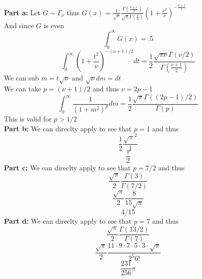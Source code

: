 \documentclass[answers,12pt,addpoints]{exam}
\begin{document}
\begin{questions}
    \begin{solution}
        \textbf{Part a:}
            Let $G \sim \Gamma_{\nu}$ thus 
            $G(x) = \frac{1}{\sqrt{\nu}} \frac{\Gamma(\frac{\nu + 1}{2})}{\sqrt{\pi} \Gamma(\frac{\nu}{2})} (1 + \frac{x^2}{\nu})^{-\frac{\nu + 1}{2}}$\\
            And since $G$ is even
            $$ \int_{0}^{\infty}G(x) = .5 $$
            $$ \int_0^{\infty} \left( 1 + \frac{t^2}{\nu}\right)^{-(\nu +1) /2 }dt = \frac{1}{2} \frac{\sqrt{\pi \nu} \Gamma(\nu/2)}{\Gamma(\frac{\nu +1}{2})} $$
            We can sub $m = t \sqrt{\nu}$ and $\sqrt{\nu} dm = dt$\\
            We can take $p = (\nu + 1) / 2$ and thus $\nu = 2p -1$\\
            $$ \int_0^{\infty} \frac{1}{(1 + m^2)^p} dm = \frac{1}{2} \frac{\sqrt{\pi} \Gamma((2p - 1)/2)}{\Gamma(p)} $$
            This is valid for $p > 1/2$\\
        \textbf{Part b:}
            We can direclty apply to see that $p = 1$ and thus 
            $$ \frac{1}{2} \frac{\sqrt{\pi}^2}{1}$$
            $$ \frac{\pi}{2}$$
        \textbf{Part c:}
            We can direclty apply to see that $p = 7/2$ and thus 
            $$ \frac{\sqrt{\pi}}{2} \frac{\Gamma(3)}{\Gamma(7/2)}$$
            $$ \frac{\sqrt{\pi}}{2} \frac{8}{15 \sqrt{\pi}}$$
            $$ 4/15$$
        \textbf{Part d:}
            We can direclty apply to see that $p = 7$ and thus 
            $$ \frac{\sqrt{\pi}}{2} \frac{\Gamma(13/2)}{\Gamma(7)}$$
            $$ \frac{\sqrt{\pi}}{2} \frac{11 \cdot 9 \cdot 7 \cdot 5 \cdot 3 \cdot \sqrt{\pi}}{2^5 6!}$$
            $$ \frac{231}{256} \pi$$
    \end{solution}

\end{questions}
\end{document}
